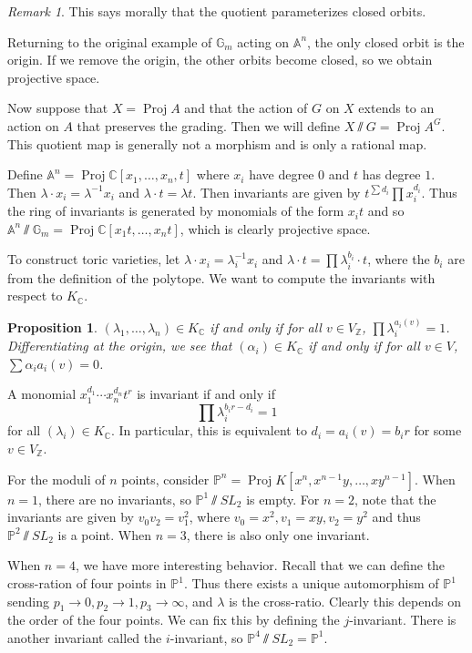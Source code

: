 \documentclass[leqno, openany]{memoir}
\newtheorem{prop}[thm]{Proposition}
\theoremstyle{definition}
\theoremstyle{remark}
\newtheorem{rmk}[thm]{Remark}
\theoremstyle{plain}
\theoremstyle{definition}
\theoremstyle{remark}
\newcommand{\A}{\mathbb{A}}
\newcommand{\C}{\mathbb{C}}
\newcommand{\Z}{\mathbb{Z}}
\renewcommand{\P}{\mathbb{P}}
\DeclareMathOperator{\Proj}{Proj}
\begin{document}
\begin{rmk} This says morally that the quotient parameterizes closed orbits.
\end{rmk}

Returning to the original example of $\mathbb{G}_m$ acting on $\A^n$, the only
closed orbit is the origin. If we remove the origin, the other orbits become
closed, so we obtain projective space.

Now suppose that $X = \Proj A$ and that the action of $G$ on $X$ extends to an
action on $A$ that preserves the grading. Then we will define $X \sslash G =
\Proj A^G$. This quotient map is generally not a morphism and is only a
rational map.

Define $\A^n = \Proj \C[x_1, \ldots, x_n,t]$ where $x_i$ have degree $0$ and
$t$ has degree $1$. Then $\lambda \cdot x_i = \lambda^{-1} x_i$ and $\lambda
\cdot t = \lambda t$. Then invariants are given by $t^{\sum d_i} \prod
x_i^{d_i}$. Thus the ring of invariants is generated by monomials of the form
$x_it$ and so $\A^n \sslash \mathbb{G}_m = \Proj \C[x_1 t, \ldots, x_n t]$,
which is clearly projective space.

To construct toric varieties, let $\lambda \cdot x_i = \lambda_i^{-1} x_i$ and
$\lambda \cdot t = \prod \lambda_i^{b_i} \cdot t$, where the $b_i$ are from the
definition of the polytope. We want to compute the invariants with respect to
$K_{\C}$.

\begin{prop} $(\lambda_1, \ldots, \lambda_n) \in K_{\C}$ if and only if for all
    $v \in V_{\Z}$, $\prod \lambda_i^{a_i(v)} = 1$. Differentiating at the
    origin, we see that $(\alpha_i) \in K_{\C}$ if and only if for all $v\in
    V$, $\sum \alpha_i a_i(v) = 0$.  \end{prop}

A monomial $x_1^{d_1} \cdots x_n^{d_n} t^r$ is invariant if and only if \[
\prod \lambda_i^{b_i r - d_i} = 1 \] for all $(\lambda_i) \in K_{\C}$. In
particular, this is equivalent to $d_i = a_i(v) = b_i r$ for some $v \in
V_{\Z}$.

For the moduli of $n$ points, consider $\P^n = \Proj K[x^n, x^{n-1} y, \ldots,
xy^{n-1}]$. When $n = 1$, there are no invariants, so $\P^1 \sslash SL_2$ is
empty. For $n = 2$, note that the invariants are given by $v_0v_2 = v_1^2$,
where $v_0 = x^2, v_1 = xy, v_2 = y^2$ and thus $\P^2 \sslash SL_2$ is a point.
When $n = 3$, there is also only one invariant.

When $n = 4$, we have more interesting behavior. Recall that we can define the
cross-ration of four points in $\P^1$. Thus there exists a unique automorphism
of $\P^1$ sending $p_1 \to 0, p_2 \to 1, p_3 \to \infty$, and $\lambda$ is the
cross-ratio. Clearly this depends on the order of the four points. We can fix
this by defining the $j$-invariant. There is another invariant called the
$i$-invariant, so $\P^4 \sslash SL_2 = \P^1$.
\end{document}

